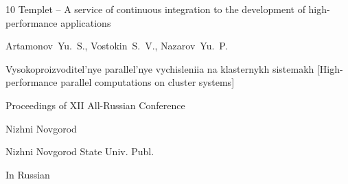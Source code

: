 \begin{thebibliography}{10}
\paper Templet – A service of continuous integration  to the development  of high-performance applications

\by Artamonov~Yu.~S.,  Vostokin~S.~V., Nazarov~Yu.~P.

\inbook Vysokoproizvoditel'nye parallel'nye vychisleniia na klasternykh sistemakh \rm [High-performance parallel computations on cluster systems]

\bookinfo Proceedings of XII All-Russian Conference

\publaddr Nizhni Novgorod

\publ Nizhni Novgorod State Univ. Publ.



\lang In Russian







\end{thebibliography}





\EngDate









\newpage 

\Russian

%


%

%

